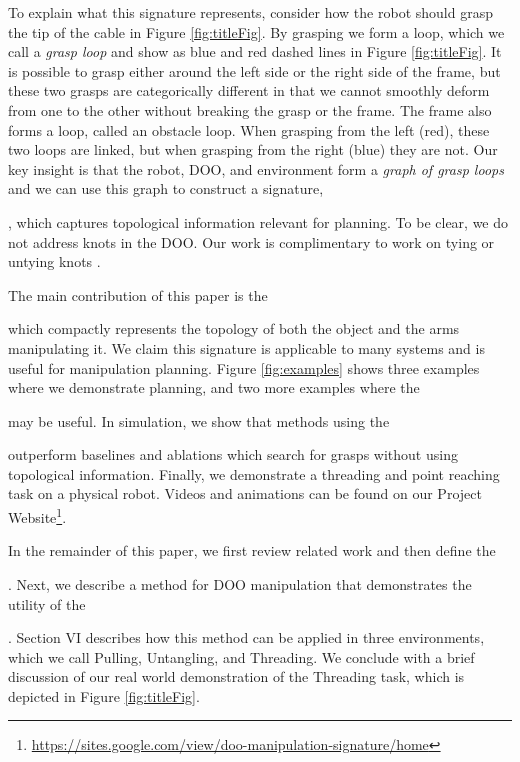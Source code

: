 To explain what this signature represents, consider how the robot should grasp the tip of the cable in Figure \ref{fig:titleFig}. By grasping we form a loop, which we call a \textit{grasp loop} and show as blue and red dashed lines in Figure \ref{fig:titleFig}. It is possible to grasp either around the left side or the right side of the frame, but these two grasps are categorically different in that we cannot smoothly deform from one to the other without breaking the grasp or the frame. The frame also forms a loop, called an obstacle loop. When grasping from the left (red), these two loops are linked, but when grasping from the right (blue) they are not. Our key insight is that the robot, DOO, and environment form a \textit{graph of grasp loops} and we can use this graph to construct a signature, \signature{}, which captures topological information relevant for planning. To be clear, we do not address knots in the DOO. Our work is complimentary to work on tying or untying knots \cite{WakamatsuKnots2005, Saha07, UntanglingFull, WeifuKnots}.

The main contribution of this paper is the \signature{} which compactly represents the topology of both the object and the arms manipulating it. We claim this signature is applicable to many systems and is useful for manipulation planning. Figure \ref{fig:examples} shows three examples where we demonstrate planning, and two more examples where the \signature{} may be useful. In simulation, we show that methods using the \signature{} outperform baselines and ablations which search for grasps without using topological information. Finally, we demonstrate a threading and point reaching task on a physical robot. Videos and animations can be found on our Project Website\footnote{\href{https://sites.google.com/view/doo-manipulation-signature/home}{https://sites.google.com/view/doo-manipulation-signature/home}}.

In the remainder of this paper, we first review related work and then define the \signature{}. Next, we describe a method for DOO manipulation that demonstrates the utility of the \signature{}. Section VI describes how this method can be applied in three environments, which we call Pulling, Untangling, and Threading. We conclude with a brief discussion of our real world demonstration of the Threading task, which is depicted in Figure \ref{fig:titleFig}.
